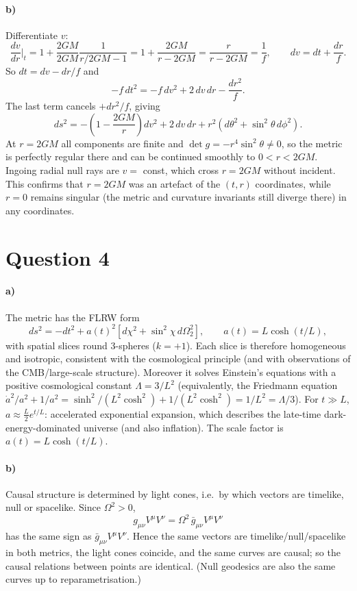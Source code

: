 \documentclass[11pt]{article}
\begin{document}
\paragraph{b)} Differentiate $v$:
\[
\frac{dv}{dr}\Big|_t=1+\frac{2GM}{2GM}\frac{1}{r/2GM-1}=1+\frac{2GM}{r-2GM}=\frac{r}{r-2GM}=\frac1{f},
\qquad dv=dt+\frac{dr}{f}.
\]
So $dt=dv-dr/f$ and
\[
-f\,dt^2=-f\,dv^2+2\,dv\,dr-\frac{dr^2}{f}.
\]
The last term cancels $+dr^2/f$, giving
\[
\boxed{ds^2=-\left(1-\frac{2GM}{r}\right)dv^2+2\,dv\,dr+r^2(d\theta^2+\sin^2\theta\,d\phi^2).}
\]
At $r=2GM$ all components are finite and $\det g=-r^4\sin^2\theta\neq0$, so the metric is perfectly regular there and can be continued smoothly to $0<r<2GM$. Ingoing radial null rays are $v=$ const, which cross $r=2GM$ without incident. This confirms that $r=2GM$ was an artefact of the $(t,r)$ coordinates, while $r=0$ remains singular (the metric and curvature invariants still diverge there) in any coordinates.

\section*{Question 4}
\paragraph{a)} The metric has the FLRW form
\[
ds^2=-dt^2+a(t)^2\left[d\chi^2+\sin^2\chi\, d\Omega_2^2\right],\qquad a(t)=L\cosh(t/L),
\]
with spatial slices round 3-spheres ($k=+1$). Each slice is therefore homogeneous and isotropic, consistent with the cosmological principle (and with observations of the CMB/large-scale structure). Moreover it solves Einstein's equations with a positive cosmological constant $\Lambda=3/L^2$ (equivalently, the Friedmann equation $\dot a^2/a^2+1/a^2=\sinh^2/(L^2\cosh^2)+1/(L^2\cosh^2)=1/L^2=\Lambda/3$). For $t\gg L$, $a\approx\tfrac L2 e^{t/L}$: accelerated exponential expansion, which describes the late-time dark-energy-dominated universe (and also inflation). The scale factor is $a(t)=L\cosh(t/L)$.

\paragraph{b)} Causal structure is determined by light cones, i.e.\ by which vectors are timelike, null or spacelike. Since $\Omega^2>0$,
\[
g_{\mu\nu}V^\mu V^\nu=\Omega^2\,\bar g_{\mu\nu}V^\mu V^\nu
\]
has the same sign as $\bar g_{\mu\nu}V^\mu V^\nu$. Hence the same vectors are timelike/null/spacelike in both metrics, the light cones coincide, and the same curves are causal; so the causal relations between points are identical. (Null geodesics are also the same curves up to reparametrisation.)
\end{document}
